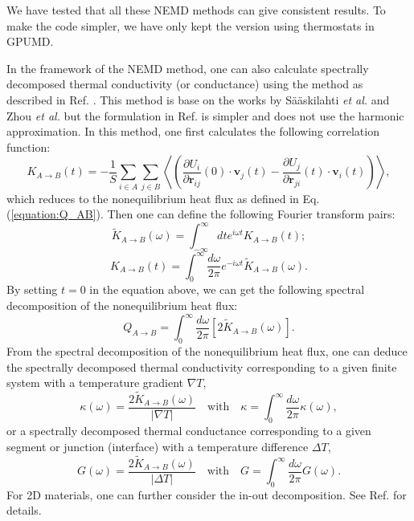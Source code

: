 \documentclass[12pt,a4paper]{report}
\newcommand{\vect}[1]{\boldsymbol{#1}}
\begin{document}
We have tested that all these NEMD methods can give consistent results. To make the code simpler, we have only kept the version using thermostats in GPUMD.

In the framework of the NEMD method, one can also calculate spectrally decomposed thermal conductivity (or conductance) using the method as described in Ref. \cite{fan2017prb}. This method is base on the works by S\"a\"askilahti \textit{et al.} \cite{saaskilahti2014prb,saaskilahti2015prb} and Zhou \textit{et al.} \cite{zhou2015prb_b} but the formulation in Ref. \cite{fan2017prb} is simpler and does not use the harmonic approximation. In this method, one first calculates the following correlation function:
\begin{equation}
\label{equation:K_time}
\boxed{
K_{A \rightarrow B}(t) = - \frac{1}{S} \sum_{i \in A} \sum_{j \in B}
\left\langle
\left(\frac{\partial U_i}{\partial \vect{r}_{ij}} (0)\cdot \vect{v}_j(t)
-\frac{\partial U_j}{\partial \vect{r}_{ji}} (t) \cdot \vect{v}_i (t) \right)
\right\rangle
},
\end{equation}
which reduces to the nonequilibrium heat flux as defined in Eq. (\ref{equation:Q_AB}). Then one can define the following Fourier transform pairs:
\begin{equation}
\label{equation:K_omega_from_time}
\boxed{
\tilde{K}_{A \rightarrow B}(\omega)
= \int_{-\infty}^{\infty} dt e^{i\omega t}
K_{A \rightarrow B}(t)
};
\end{equation}
\begin{equation}
\label{equation:K_time_from_omega}
\boxed{
K_{A \rightarrow B}(t)
= \int_{0}^{\infty} \frac{d\omega}{2\pi} e^{-i\omega t}
\tilde{K}_{A \rightarrow B}(\omega)
}.
\end{equation}
By setting $t=0$ in the equation above, we can get the following spectral decomposition of the nonequilibrium heat flux:
\begin{equation}
\boxed{
Q_{A \rightarrow B}
= \int_{0}^{\infty} \frac{d\omega}{2\pi}
\left[2\tilde{K}_{A \rightarrow B}(\omega)\right]
}.
\end{equation}
From the spectral decomposition of the nonequilibrium heat flux, one can deduce the spectrally decomposed thermal conductivity corresponding to a given finite system with a temperature gradient $\nabla T$,
\begin{equation}
\boxed{
\kappa(\omega)
= \frac{2\tilde{K}_{A \rightarrow B}(\omega)}{|\nabla T|}
\quad
\text{with}
\quad
\kappa = \int_{0}^{\infty} \frac{d\omega}{2\pi} \kappa(\omega)
},
\end{equation}
or a spectrally decomposed thermal conductance corresponding to a given segment or junction (interface) with a temperature difference $\Delta T$,
\begin{equation}
\boxed{
G(\omega)
= \frac{2\tilde{K}_{A \rightarrow B}(\omega)}{|\Delta T|}
\quad
\text{with}
\quad
G = \int_{0}^{\infty} \frac{d\omega}{2\pi} G(\omega)
}.
\end{equation}
For 2D materials, one can further consider the in-out decomposition. See Ref. \cite{fan2017prb} for details.
\end{document}
